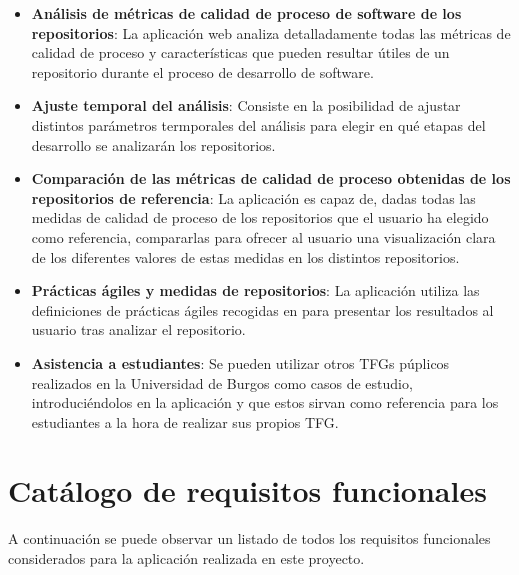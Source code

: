 \begin{itemize}

\item \textbf{Análisis de métricas de calidad de proceso de software de los repositorios}: La aplicación web analiza detalladamente todas las métricas de calidad de proceso y características que pueden resultar útiles de un repositorio durante el proceso de desarrollo de software.

\item \textbf{Ajuste temporal del análisis}: Consiste en la posibilidad de ajustar distintos parámetros termporales del análisis para elegir en qué etapas del desarrollo se analizarán los repositorios.

\item \textbf{Comparación de las métricas de calidad de proceso obtenidas de los repositorios de referencia}: La aplicación es capaz de, dadas todas las medidas de calidad de proceso de los repositorios que el usuario ha elegido como referencia, compararlas para ofrecer al usuario una visualización clara de los diferentes valores de estas medidas en los distintos repositorios.

\item \textbf{Prácticas ágiles y medidas de repositorios}: La aplicación utiliza las definiciones de prácticas ágiles recogidas en \cite{agileSubwayMap} para presentar los resultados al usuario tras analizar el repositorio.

\item \textbf{Asistencia a estudiantes}: Se pueden utilizar otros TFGs púplicos realizados en la Universidad de Burgos como casos de estudio, introduciéndolos en la aplicación y que estos sirvan como referencia para los estudiantes a la hora de realizar sus propios TFG.

\end{itemize}

\section{Catálogo de requisitos funcionales}

A continuación se puede observar un listado de todos los requisitos funcionales considerados para la aplicación realizada en este proyecto.

